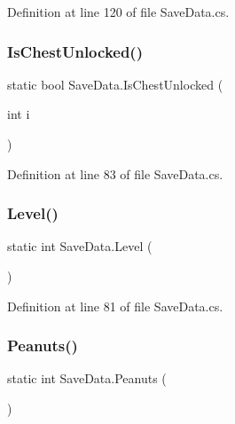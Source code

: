 Definition at line 120 of file Save\+Data.\+cs.

\mbox{\label{class_save_data_adcb64a2f684f5f008e8b133650556ca9}} 
\subsubsection{\texorpdfstring{Is\+Chest\+Unlocked()}{IsChestUnlocked()}}
{\footnotesize\ttfamily static bool Save\+Data.\+Is\+Chest\+Unlocked (\begin{DoxyParamCaption}\item[{int}]{i }\end{DoxyParamCaption})\hspace{0.3cm}{\ttfamily [static]}}



Definition at line 83 of file Save\+Data.\+cs.

\mbox{\label{class_save_data_ae7027796e3b0ca976e50853407bdd78a}} 
\subsubsection{\texorpdfstring{Level()}{Level()}}
{\footnotesize\ttfamily static int Save\+Data.\+Level (\begin{DoxyParamCaption}{ }\end{DoxyParamCaption})\hspace{0.3cm}{\ttfamily [static]}}



Definition at line 81 of file Save\+Data.\+cs.

\mbox{\label{class_save_data_a5de49da680f4432b988e56698c79dee5}} 
\subsubsection{\texorpdfstring{Peanuts()}{Peanuts()}}
{\footnotesize\ttfamily static int Save\+Data.\+Peanuts (\begin{DoxyParamCaption}{ }\end{DoxyParamCaption})\hspace{0.3cm}{\ttfamily [static]}}



